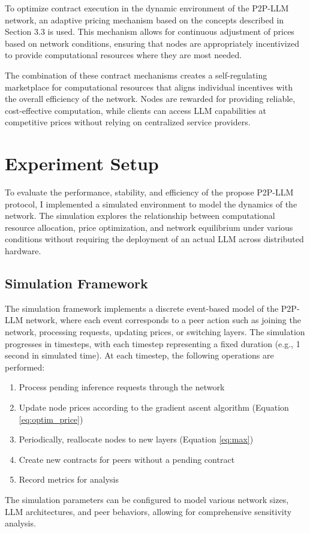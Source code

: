 \documentclass[preprint,twoside,11pt]{article}
\begin{document}
To optimize contract execution in the dynamic environment of the P2P-LLM network, an adaptive pricing mechanism based on the concepts described in Section 3.3 is used. This mechanism allows for continuous adjustment of prices based on network conditions, ensuring that nodes are appropriately incentivized to provide computational resources where they are most needed.

The combination of these contract mechanisms creates a self-regulating marketplace for computational resources that aligns individual incentives with the overall efficiency of the network. Nodes are rewarded for providing reliable, cost-effective computation, while clients can access LLM capabilities at competitive prices without relying on centralized service providers.

\section{Experiment Setup}

To evaluate the performance, stability, and efficiency of the propose P2P-LLM protocol, I implemented a simulated environment
to model the dynamics of the network.
The simulation explores the relationship between computational resource allocation, price optimization, and network equilibrium under various conditions without requiring the deployment of an actual LLM across distributed hardware.

\subsection{Simulation Framework}
The simulation framework implements a discrete event-based model of the P2P-LLM network, where each event corresponds to a peer action such as joining the network, processing requests, updating prices, or switching layers. The simulation progresses in timesteps, with each timestep representing a fixed duration (e.g., 1 second in simulated time). At each timestep, the following operations are performed:
\begin{enumerate}
	\item Process pending inference requests through the network
	\item Update node prices according to the gradient ascent algorithm (Equation \ref{eq:optim_price})
	\item Periodically, reallocate nodes to new layers (Equation \ref{eq:max})
	\item Create new contracts for peers without a pending contract
	\item Record metrics for analysis
\end{enumerate}
The simulation parameters can be configured to model various network sizes, LLM architectures, and peer behaviors, allowing for comprehensive sensitivity analysis.
\end{document}
